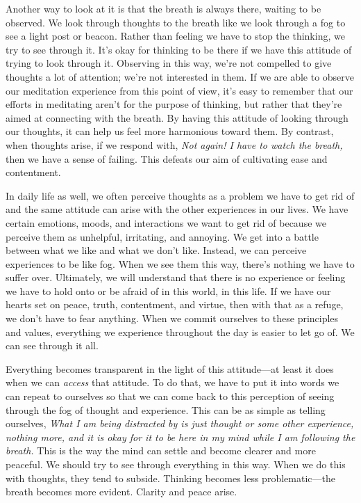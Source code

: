 Another way to look at it is that the breath is always there, waiting 
to be observed. We look through thoughts to the breath like we look 
through a fog to see a light post or beacon. Rather than feeling we 
have to stop the thinking, we try to see through it. It's okay for 
thinking to be there if we have this attitude of trying to look through 
it. Observing in this way, we're not compelled to give thoughts a lot 
of attention; we're not interested in them. If we are able to observe 
our meditation experience from this point of view, it's easy to 
remember that our efforts in meditating aren't for the purpose of 
thinking, but rather that they're aimed at connecting with the breath. 
By having this attitude of looking through our thoughts, it can help us 
feel more harmonious toward them. By contrast, when thoughts arise, if 
we respond with, \emph{Not again! I have to watch the breath,} then we 
have a sense of failing. This defeats our aim of cultivating ease and 
contentment.

In daily life as well, we often perceive thoughts as a problem we have 
to get rid of and the same attitude can arise with the other 
experiences in our lives. We have certain emotions, moods, and 
interactions we want to get rid of because we perceive them as 
unhelpful, irritating, and annoying. We get into a battle between what 
we like and what we don't like. Instead, we can perceive experiences to 
be like fog. When we see them this way, there's nothing we have to 
suffer over. Ultimately, we will understand that there is no experience 
or feeling we have to hold onto or be afraid of in this world, in this 
life. If we have our hearts set on peace, truth, contentment, and 
virtue, then with that as a refuge, we don't have to fear anything. 
When we commit ourselves to these principles and values, everything we 
experience throughout the day is easier to let go of. We can see 
through it all.

Everything becomes transparent in the light of this attitude---at least 
it does when we can \emph{access} that attitude. To do that, we have to 
put it into words we can repeat to ourselves so that we can come back 
to this perception of seeing through the fog of thought and experience. 
This can be as simple as telling ourselves, \emph{What I am being 
distracted by is just thought or some other experience, nothing more, 
and it is okay for it to be here in my mind while I am following the 
breath.} This is the way the mind can settle and become clearer and 
more peaceful. We should try to see through everything in this way. 
When we do this with thoughts, they tend to subside. Thinking becomes 
less problematic---the breath becomes more evident. Clarity and peace 
arise.


